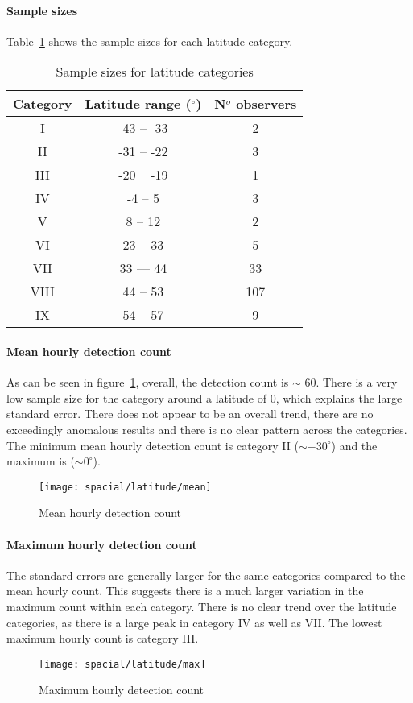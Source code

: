 \paragraph{Sample sizes \\}
Table~\ref{tab:spac:lat} shows the sample sizes for each latitude category.
\begin{table}[h!]
	\centering
	\begin{tabular}{ccc}
		\hline 
		Category & Latitude range ($^{\circ}$) & N$^o$ observers \\ 
		\hline 
		I & -43 -- -33 & 2 \\
		II & -31 -- -22 & 3 \\
		III & -20 -- -19 & 1 \\
		IV & -4 -- 5 & 3 \\
		V & 8 -- 12 & 2 \\
		VI & 23 -- 33 & 5 \\
		VII & 33 --- 44 & 33 \\
		VIII & 44 -- 53 & 107\\
		IX & 54 -- 57 & 9 \\  
		\hline
	\end{tabular} 
	\caption{Sample sizes for latitude categories \label{tab:spac:lat}}
\end{table}

\paragraph{Mean hourly detection count\\}
As can be seen in figure~\ref{fig:spac:lat:mean}, overall, the detection count is $\sim$ 60. There is a very low sample size for the category around a latitude of 0, which explains the large standard error. There does not appear to be an overall trend, there are no exceedingly anomalous results and there is no clear pattern across the categories. The minimum mean hourly detection count is category II ($\sim -30^{\circ}$) and the maximum is ($\sim 0^{\circ}$).
\begin{figure}[h!]
	\centering
	\texttt{[image: spacial/latitude/mean]}
	\caption{Mean hourly detection count
		\label{fig:spac:lat:mean}}
\end{figure}
\paragraph{Maximum hourly detection count\\}
The standard errors are generally larger for the same categories compared to the mean hourly count. This suggests there is a much larger variation in the maximum count within each category. There is no clear trend over the latitude categories, as there is a large peak in category IV as well as VII. The lowest maximum hourly count is category III.
\begin{figure}[h!]
	\centering
	\texttt{[image: spacial/latitude/max]}
	\caption{Maximum hourly detection count
		\label{fig:spac:lat:max}}
\end{figure}

